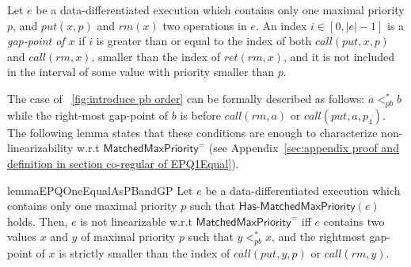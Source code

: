 \begin{definition}\label{def:gap-point for matched put and rm operations}
Let $e$ be a data-differentiated execution which contains only one maximal priority $p$, and $\textit{put}(x,p)$ and $\textit{rm}(x)$ two operations in $e$. An index $i\in [0,|e|-1]$ is a \emph{gap-point of $x$} if $i$ is greater than or equal to the index of both $\textit{call}(\textit{put},x,p)$ and $\textit{call}(\textit{rm},x)$, smaller than the index of $\textit{ret}(\textit{rm},x)$, and it is not included in the interval of some value with priority smaller than $p$.
\end{definition}

The case of \figurename~\ref{fig:introduce pb order} can be formally described as follows: $a <_{\textit{pb}}^* b$ while the right-most gap-point of $b$ is before $\textit{call}(\textit{rm},a)$ or $\textit{call}(\textit{put},a,p_4)$. The following lemma states that these conditions are enough to characterize non-linearizability w.r.t $\mathsf{MatchedMaxPriority}^{=}$ (see Appendix~\ref{sec:appendix proof and definition in section co-regular of EPQ1Equal}).

\begin{restatable}{lemma}{EPQOneEqualAsPBandGP}
\label{lemma:EPQ1Equal as pb order and gap-point}
Let $e$ be a data-differentiated execution which contains only one maximal priority $p$ such that $\mathsf{Has\text{-}MatchedMaxPriority}(e)$ holds.
Then, $e$ is not linearizable w.r.t $\mathsf{MatchedMaxPriority}^{=}$ iff $e$ contains two values $x$ and $y$ of maximal priority $p$ such that $y <_{\textit{pb}}^* x$, and the rightmost gap-point of $x$ is strictly smaller than the index of $\textit{call}(\textit{put},y,p)$ or $\textit{call}(\textit{rm},y)$.
\end{restatable}

